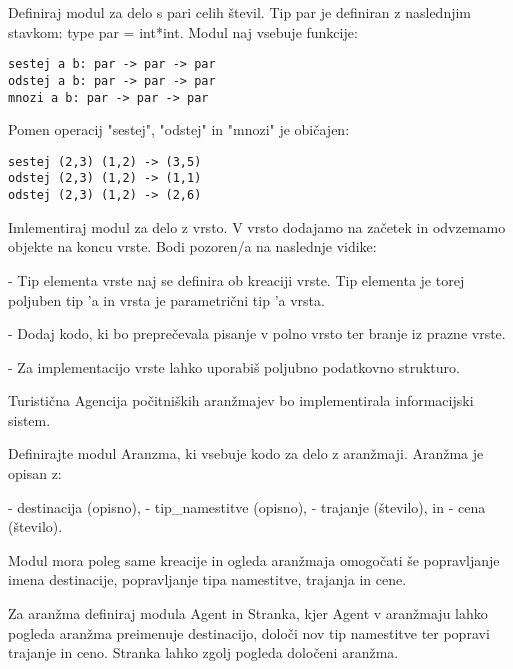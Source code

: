\begin{ex}
Definiraj modul za delo s pari celih \v stevil. Tip par je definiran z
naslednjim stavkom: type par = int*int. Modul naj vsebuje funkcije:

\begin{lstlisting}
sestej a b: par -> par -> par
odstej a b: par -> par -> par
mnozi a b: par -> par -> par
\end{lstlisting}

Pomen operacij "sestej", "odstej" in "mnozi" je obi\v cajen:
\begin{lstlisting}
sestej (2,3) (1,2) -> (3,5)
odstej (2,3) (1,2) -> (1,1)
odstej (2,3) (1,2) -> (2,6)
\end{lstlisting}

\end{ex}
\begin{ex}

Imlementiraj modul za delo z vrsto. V vrsto dodajamo na za\v cetek in
odvzemamo objekte na koncu vrste. Bodi pozoren/a na naslednje vidike:

- Tip elementa vrste naj se definira ob kreaciji vrste. Tip elementa
  je torej poljuben tip 'a in vrsta je parametri\v cni tip 'a vrsta.
  
- Dodaj kodo, ki bo prepre\v cevala pisanje v polno vrsto ter branje iz
  prazne vrste.
  
- Za implementacijo vrste lahko uporabi\v s poljubno podatkovno strukturo.

\end{ex}
\begin{ex}
Turisti\v cna Agencija po\v citni\v skih aran\v zmajev bo implementirala
informacijski sistem.

Definirajte modul Aranzma, ki vsebuje kodo za delo z
aran\v zmaji. Aran\v zma je opisan z:

- destinacija (opisno), 
- tip\_namestitve (opisno), 
- trajanje (\v stevilo), in 
- cena (\v stevilo).

Modul mora poleg same kreacije in ogleda aran\v zmaja omogo\v cati \v se
popravljanje imena destinacije, popravljanje tipa namestitve, trajanja
in cene.

Za aran\v zma definiraj modula Agent in Stranka, kjer Agent v aran\v zmaju
lahko pogleda aran\v zma preimenuje destinacijo, dolo\v ci nov tip
namestitve ter popravi trajanje in ceno. Stranka lahko zgolj pogleda
dolo\v ceni aran\v zma.



\end{ex}
